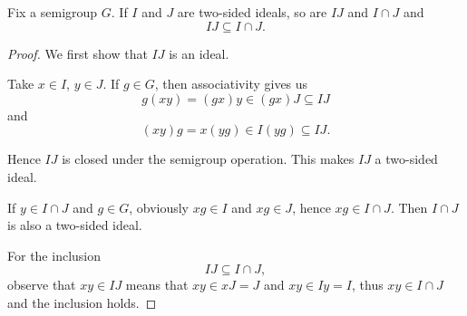 \begin{Proposition}\label{thm:product_of_semigroup_ideals_is_in_intersection}
  Fix a semigroup \( G \). If \( I \) and \( J \) are two-sided ideals, so are \( IJ \) and \( I \cap J \) and
  \begin{equation*}
    IJ \subseteq I \cap J.
  \end{equation*}
\end{Proposition}
\begin{proof}
  We first show that \( IJ \) is an ideal.

  Take \( x \in I \), \( y \in J \). If \( g \in G \), then associativity gives us
  \begin{equation*}
    g(xy) = (gx)y \in (gx)J \subseteq IJ
  \end{equation*}
  and
  \begin{equation*}
    (xy)g = x(yg) \in I(yg) \subseteq IJ.
  \end{equation*}

  Hence \( IJ \) is closed under the semigroup operation. This makes \( IJ \) a two-sided ideal.

  If \( y \in I \cap J \) and \( g \in G \), obviously \( xg \in I \) and \( xg \in J \), hence \( xg \in I \cap J \). Then \( I \cap J \) is also a two-sided ideal.

  For the inclusion
  \begin{equation*}
    IJ \subseteq I \cap J,
  \end{equation*}
  observe that \( xy \in IJ \) means that \( xy \in xJ = J \) and \( xy \in Iy = I \), thus \( xy \in I \cap J \) and the inclusion holds.
\end{proof}
